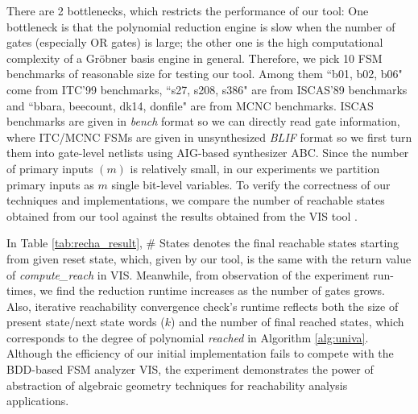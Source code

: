 There are 2 bottlenecks, which restricts the performance of our tool:
One bottleneck is that the polynomial reduction engine is slow when the number of
gates (especially OR gates) is large; the other one is the high computational complexity
of a Gr\"obner basis engine in general. Therefore, we pick 10 FSM
benchmarks of reasonable size for testing our tool. Among them ``b01,
b02, b06" come from ITC'99 benchmarks, %
``s27, s208, s386" are from  ISCAS'89 benchmarks %
 and ``bbara, beecount, dk14, donfile" are from MCNC benchmarks. %
ISCAS benchmarks are given in {\it bench} format so we can directly read gate information,
where ITC/MCNC FSMs are given in unsynthesized {\it BLIF} format so we first turn them
into gate-level netlists using AIG-based synthesizer ABC. %
Since the number of primary inputs $(m)$ is relatively small, in our experiments we partition
primary inputs as $m$ single bit-level variables. To verify the
correctness of our techniques and implementations, we compare the
number of reachable states obtained from our tool against the results
obtained from the VIS tool \cite{brayton1996vis}. 

In Table \ref{tab:recha_result}, \# States denotes the final reachable states
starting from given reset state, which, given by our tool, is the same with
the return value of {\it compute\_reach} in VIS. Meanwhile, from observation
of the experiment run-times, we find the reduction runtime increases
as the number of gates grows. Also, iterative reachability convergence
check's runtime reflects both the size of present state/next state
words ($k$) and the number of final reached states, which corresponds
to the degree of polynomial {\it reached} in Algorithm \ref{alg:univa}. 
Although the efficiency of our initial implementation fails to compete
with the BDD-based FSM analyzer VIS, the experiment
demonstrates the power of abstraction of algebraic geometry techniques
for reachability analysis applications. 

